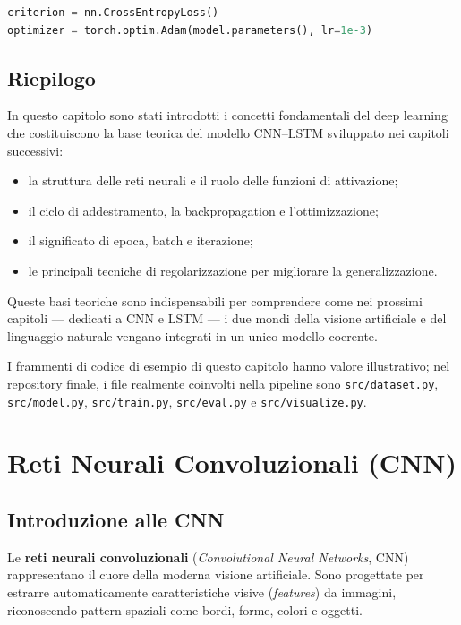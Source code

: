 \documentclass[11pt,a4paper]{report}
\begin{document}
\begin{lstlisting}[language=Python, caption={Definizione della funzione di perdita e dell’ottimizzatore in PyTorch.}]
criterion = nn.CrossEntropyLoss()
optimizer = torch.optim.Adam(model.parameters(), lr=1e-3)
\end{lstlisting}

\section{Riepilogo}

In questo capitolo sono stati introdotti i concetti fondamentali del deep learning che costituiscono la base teorica del modello CNN–LSTM sviluppato nei capitoli successivi:
\begin{itemize}
  \item la struttura delle reti neurali e il ruolo delle funzioni di attivazione;
  \item il ciclo di addestramento, la backpropagation e l’ottimizzazione;
  \item il significato di epoca, batch e iterazione;
  \item le principali tecniche di regolarizzazione per migliorare la generalizzazione.
\end{itemize}

Queste basi teoriche sono indispensabili per comprendere come nei prossimi capitoli — dedicati a CNN e LSTM — i due mondi della visione artificiale e del linguaggio naturale vengano integrati in un unico modello coerente.

\begin{tcolorbox}[title=Riferimento al codice]
I frammenti di codice di esempio di questo capitolo hanno valore illustrativo; nel repository finale, i file realmente coinvolti nella pipeline sono \texttt{src/dataset.py}, \texttt{src/model.py}, \texttt{src/train.py}, \texttt{src/eval.py} e \texttt{src/visualize.py}.
\end{tcolorbox}


\chapter{Reti Neurali Convoluzionali (CNN)}

\section{Introduzione alle CNN}

Le \textbf{reti neurali convoluzionali} (\emph{Convolutional Neural Networks}, CNN) rappresentano il cuore della moderna visione artificiale.  
Sono progettate per estrarre automaticamente caratteristiche visive (\emph{features}) da immagini, riconoscendo pattern spaziali come bordi, forme, colori e oggetti.
\end{document}
